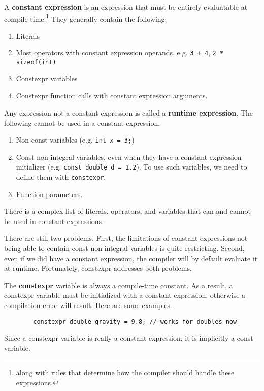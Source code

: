 \documentclass{article}
\begin{document}
    \begin{definition}
      A \textbf{constant expression} is an expression that must be entirely evaluatable at compile-time.\footnote{along with rules that determine how the compiler should handle these expressions.} They generally contain the following: 
      \begin{enumerate}
        \item Literals 
        \item Most operators with constant expression operands, e.g. \texttt{3 + 4}, \texttt{2 * sizeof(int)} 
        \item Constexpr variables  
        \item Constexpr function calls with constant expression arguments. 
      \end{enumerate}
      Any expression not a constant expression is called a \textbf{runtime expression}. The following cannot be used in a constant expression. 
      \begin{enumerate}
        \item Non-const variables (e.g. \texttt{int x = 3;}) 
        \item Const non-integral variables, even when they have a constant expression initializer (e.g. \texttt{const double d = 1.2}). To use such variables, we need to define them with \texttt{constexpr}. 
        \item Function parameters. 
      \end{enumerate}
      There is a complex list of literals, operators, and variables that can and cannot be used in constant expressions. 
    \end{definition}

    There are still two problems. First, the limitations of constant expressions not being able to contain const non-integral variables is quite restricting. Second, even if we did have a constant expression, the compiler will by default evaluate it at runtime. Fortunately, constexpr addresses both problems. 

    \begin{definition}
      The \textbf{constexpr} variable is always a compile-time constant. As a result, a constexpr variable must be initialized with a constant expression, otherwise a compilation error will result. Here are some examples. 
      \begin{lstlisting}
        constexpr double gravity = 9.8; // works for doubles now 
      \end{lstlisting} 
      Since a constexpr variable is really a constant expression, it is implicitly a const variable. 
    \end{definition} 
\end{document}
